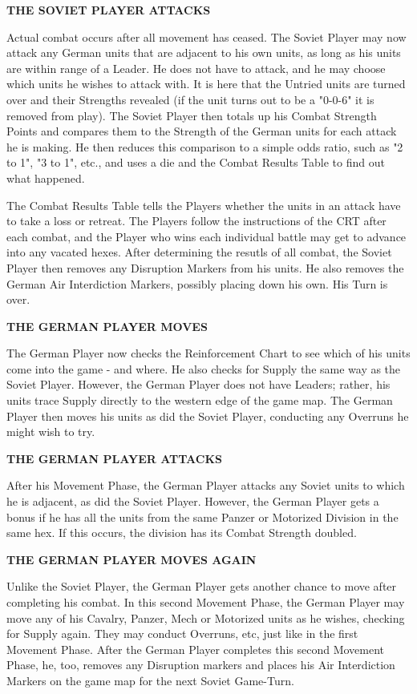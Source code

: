 \textbf{THE SOVIET PLAYER ATTACKS}

Actual combat occurs after all movement has ceased. The Soviet Player may now attack any German units that are adjacent to his own units, as long as his units are within range of a Leader. He does not have to attack, and he may choose which units he wishes to attack with. It is here that the Untried units are turned over and their Strengths revealed (if the unit turns out to be a "0-0-6" it is removed from play). The Soviet Player then totals up his Combat Strength Points and compares them to the Strength of the German units for each attack he is making. He then reduces this comparison to a simple odds ratio, such as "2 to 1", "3 to 1", etc., and uses a die and the Combat Results Table to find out what happened.

The Combat Results Table tells the Players whether the units in an attack have to take a loss or retreat. The Players follow the instructions of the CRT after each combat, and the Player who wins each individual battle may get to advance into any vacated hexes. After determining the resutls of all combat, the Soviet Player then removes any Disruption Markers from his units. He also removes the German Air Interdiction Markers, possibly placing down his own. His Turn is over.

\textbf{THE GERMAN PLAYER MOVES}

The German Player now checks the Reinforcement Chart to see which of his units come into the game - and where. He also checks for Supply the same way as the Soviet Player. However, the German Player does not have Leaders; rather, his units trace Supply directly to the western edge of the game map. The German Player then moves his units as did the Soviet Player, conducting any Overruns he might wish to try.

\textbf{THE GERMAN PLAYER ATTACKS}

After his Movement Phase, the German Player attacks any Soviet units to which he is adjacent, as did the Soviet Player. However, the German Player gets a bonus if he has all the units from the same Panzer or Motorized Division in the same hex. If this occurs, the division has its Combat Strength doubled.

\textbf{THE GERMAN PLAYER MOVES AGAIN}

Unlike the Soviet Player, the German Player gets another chance to move after completing his combat. In this second Movement Phase, the German Player may move any of his Cavalry, Panzer, Mech or Motorized units as he wishes, checking for Supply again. They may conduct Overruns, etc, just like in the first Movement Phase. After the German Player completes this second Movement Phase, he, too, removes any Disruption markers and places his Air Interdiction Markers on the game map for the next Soviet Game-Turn.

